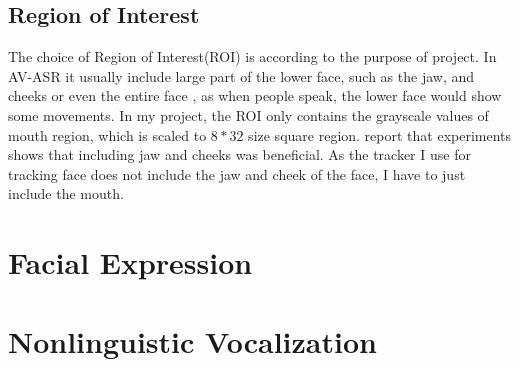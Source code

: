 \subsection{Region of Interest}
The choice of Region of Interest(ROI) is according to the purpose of project. In AV-ASR it usually include large part of the lower face, such as the jaw, and cheeks or even the entire face \cite{potamianos2003recent}, as when people speak, the lower face would show some movements. In my project, the ROI only contains the grayscale values of mouth region, which is scaled to $8 * 32$ size square region. \cite{potamianos2003recent} report that experiments shows that including jaw and cheeks was beneficial. As the tracker I use for tracking face does not include the jaw and cheek of the face, I have to just include the mouth.

\section{Facial Expression}

\section{Nonlinguistic Vocalization}